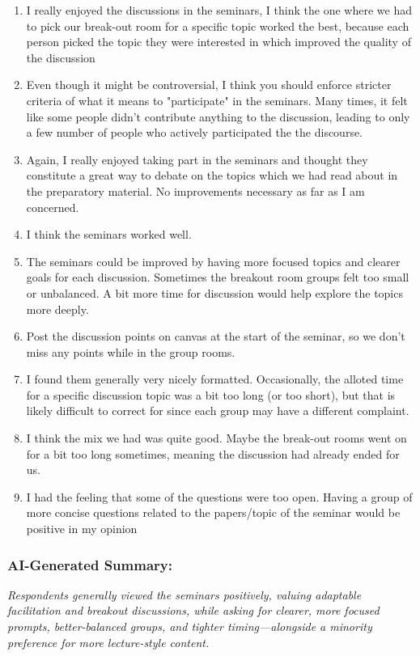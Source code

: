 \documentclass[a4paper]{report}
\begin{document}
\begin{enumerate}
  \item I really enjoyed the discussions in the seminars, I think the one where we had to pick our break-out room for a specific topic worked the best, because each person picked the topic they were interested in which improved the quality of the discussion
  \item Even though it might be controversial, I think you should enforce stricter criteria of what it means to "participate" in the seminars. Many times, it felt like some people didn't contribute anything to the discussion, leading to only a few number of people who actively participated the the discourse. 
  \item Again, I really enjoyed taking part in the seminars and thought they constitute a great way to debate on the topics which we had read about in the preparatory material. No improvements necessary as far as I am concerned.
  \item I think the seminars worked well.
  \item The seminars could be improved by having more focused topics and clearer goals for each discussion. Sometimes the breakout room groups felt too small or unbalanced. A bit more time for discussion would help explore the topics more deeply.
  \item Post the discussion points on canvas at the start of the seminar, so we don't miss any points while in the group rooms.
  \item I found them generally very nicely formatted. Occasionally, the alloted time for a specific discussion topic was a bit too long (or too short), but that is likely difficult to correct for since each group may have a different complaint.
  \item I think the mix we had was quite good. Maybe the break-out rooms went on for a bit too long sometimes, meaning the discussion had already ended for us.
  \item I had the feeling that some of the questions were too open. Having a group of more concise questions related to the papers/topic of the seminar would be positive in my opinion
\end{enumerate}

\subsubsection{AI-Generated Summary:}

\textit{Respondents generally viewed the seminars positively, valuing adaptable facilitation and breakout discussions, while asking for clearer, more focused prompts, better-balanced groups, and tighter timing—alongside a minority preference for more lecture-style content.}
\end{document}
